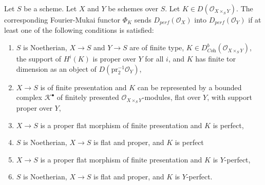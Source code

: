 \begin{lemma}
\label{lemma-fourier-mukai}
Let $S$ be a scheme. Let $X$ and $Y$ be schemes over $S$.
Let $K \in D(\mathcal{O}_{X \times_S Y})$.
The corresponding Fourier-Mukai functor $\Phi_K$ sends
$D_{perf}(\mathcal{O}_X)$ into $D_{perf}(\mathcal{O}_Y)$ if at least
one of the following conditions is satisfied:
\begin{enumerate}
\item $S$ is Noetherian, $X \to S$ and $Y \to S$ are of finite type,
$K \in D^b_{\textit{Coh}}(\mathcal{O}_{X \times_S Y})$, the support of $H^i(K)$
is proper over $Y$ for all $i$, and $K$ has finite tor dimension
as an object of $D(\text{pr}_2^{-1}\mathcal{O}_Y)$,
\item $X \to S$ is of finite presentation and $K$ can be represented
by a bounded complex $\mathcal{K}^\bullet$ of finitely presented
$\mathcal{O}_{X \times_S Y}$-modules, flat over $Y$, with support
proper over $Y$,
\item $X \to S$ is a proper flat morphism of finite presentation
and $K$ is perfect,
\item $S$ is Noetherian, $X \to S$ is flat and proper, and $K$ is perfect
\item $X \to S$ is a proper flat morphism of finite presentation
and $K$ is $Y$-perfect,
\item $S$ is Noetherian, $X \to S$ is flat and proper, and $K$ is
$Y$-perfect.
\end{enumerate}
\end{lemma}

